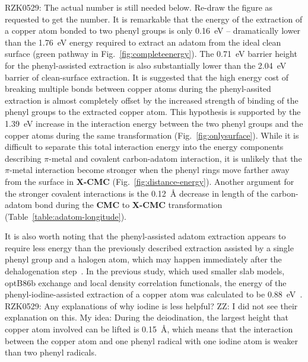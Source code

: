 \documentclass[%
 reprint,
 amsmath,amssymb,
 aps,
prb,
floatfix,
]{revtex4-2}
\newcommand{\lock}{\color{red}}
\newcommand{\zhzh}{\color{blue}}
\newcommand{\lock}{\color{black}}
\newcommand{\zhzh}{\color{blue}}
\newcommand{\comm}{\color{ForestGreen}} %
\begin{document}
{\lock

{\comm RZK0529: The actual number is still needed below. Re-draw the figure as requested to get the number.}
It is remarkable that the energy of the extraction of a copper atom bonded to two phenyl groups is only \SI{0.16}{\electronvolt} -- dramatically lower than the \SI{1.76}{\electronvolt} energy required to extract an adatom from the ideal clean surface (green pathway in Fig.~\ref{fig:completeenergy}). The \SI{0.71}{\electronvolt} barrier height for the phenyl-assisted extraction is also substantially lower than the \SI{2.04}{\electronvolt} barrier of clean-surface extraction.
It is suggested that the high energy cost of breaking multiple bonds between copper atoms during the phenyl-assited extraction is almost completely offset by the increased strength of binding of the phenyl groups to the extracted copper atom. This hypothesis is supported by the \SI{1.39}{\electronvolt} increase in the interaction energy between the two phenyl groups and the copper atoms during the same transformation (Fig.~\ref{fig:onlysurface}). While it is difficult to separate this total interaction energy into the energy components describing $\pi$-metal and covalent carbon-adatom interaction, it is unlikely that the $\pi$-metal interaction become stronger when the phenyl rings move farther away from the surface in \textbf{X-CMC} (Fig.~\ref{fig:distance-energy}). Another argument for the stronger covalent interactions is the \SI{0.12}{\angstrom} decrease in length of the carbon-adatom bond during the \textbf{CMC} to \textbf{X-CMC} transformation (Table~\ref{table:adatom-longitude}).

It is also worth noting that the phenyl-assisted adatom extraction appears to require less energy than the previously described extraction assisted by a single phenyl group and a halogen atom, which may happen immediately after the dehalogenation step~\cite{chemeurope2017}. 
In the previous study, which used smaller slab models, optB86b exchange and local density correlation functionals, the energy of the phenyl-iodine-assisted extraction of a copper atom was calculated to be \SI{0.88}{\electronvolt}~\cite{chemeurope2017}. {\comm RZK0529: Any explanations of why iodine is less helpful?} {\zhzh ZZ: I did not see their explanation on this. My idea: During the deiodination, the largest height that copper atom involved can be lifted is \SI{0.15}{\angstrom}, which means that the interaction between the copper atom and one phenyl radical with one iodine atom is weaker than two phenyl radicals.}

}
\end{document}
